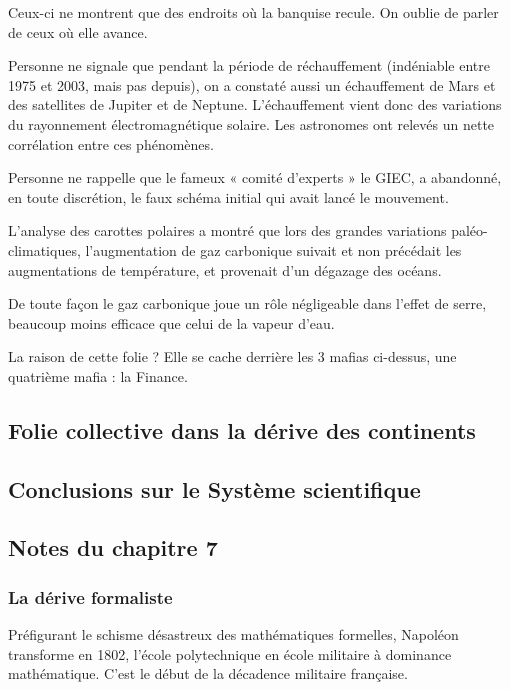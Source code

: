 \documentclass[a4paper,12pt]{article}
\begin{document}
Ceux-ci ne montrent que des endroits où la banquise recule. On oublie de parler de ceux où elle avance.

Personne ne signale que pendant la période de réchauffement (indéniable entre 1975 et 2003, mais pas depuis), on a constaté aussi un échauffement de Mars et des satellites de Jupiter et de Neptune. L’échauffement vient donc des variations du rayonnement électromagnétique solaire. Les astronomes ont relevés un nette corrélation entre ces phénomènes.

Personne ne rappelle que le fameux « comité d’experts » le GIEC, a abandonné, en toute discrétion, le faux schéma initial qui avait lancé le mouvement.

L’analyse des carottes polaires a montré que lors des grandes variations paléo-climatiques, l’augmentation de gaz carbonique suivait et non précédait les augmentations de température, et provenait d’un dégazage des océans.

De toute façon le gaz carbonique joue un rôle négligeable dans l’effet de serre, beaucoup moins efficace que celui de la vapeur d’eau.

La raison de cette folie ? Elle se cache derrière les 3 mafias ci-dessus, une quatrième mafia : la Finance.




\subsection {Folie collective dans la dérive des continents}

\subsection {Conclusions sur le Système scientifique}

\subsection {Notes du chapitre 7}

\subsubsection{La dérive formaliste}

Préfigurant le schisme désastreux des mathématiques formelles, Napoléon transforme en 1802,  l'école 
polytechnique en école militaire à dominance mathématique. C'est le début de la décadence militaire française.
\end{document}
